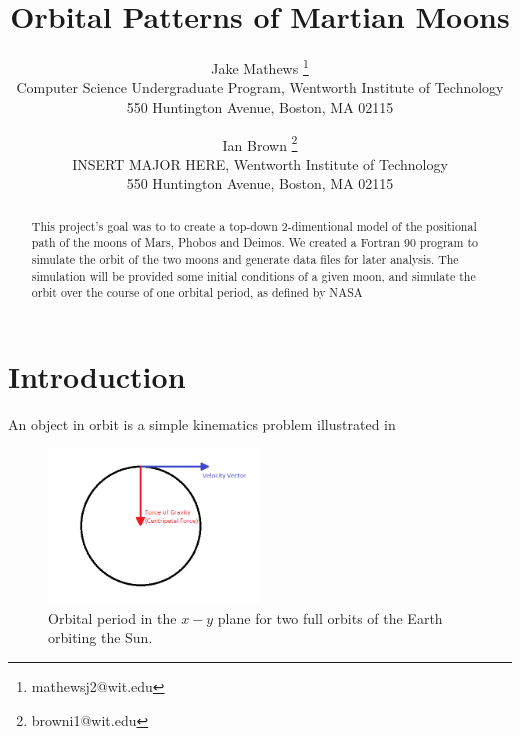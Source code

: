 \documentclass[11pt]{article}
\begin{document}
\title{\textbf{Orbital Patterns of Martian Moons}}

\author{Jake Mathews
\thanks{mathewsj2@wit.edu}\\
Computer Science Undergraduate Program, Wentworth Institute of Technology\\
550 Huntington Avenue, Boston, MA 02115\\
\and Ian Brown
\thanks{browni1@wit.edu}\\
INSERT MAJOR HERE, Wentworth Institute of Technology\\
550 Huntington Avenue, Boston, MA 02115}

\maketitle

\begin{abstract}

This project's goal was to to create a top-down 2-dimentional model
of the positional path of the moons of Mars, Phobos and Deimos.
We created a Fortran 90 program to simulate the orbit of the two moons
and generate data files for later analysis.
The simulation will be provided some initial conditions of a given moon,
and simulate the orbit over the course of one orbital period, as defined
by NASA~\cite{nasa}

\end{abstract}

\section{Introduction}
An object in orbit is a simple kinematics problem illustrated in 

\begin{figure}[ht]
  \centering
  \includegraphics[width=0.5\textwidth, angle =0]{../images/centripetal-force}
  \caption{Orbital period in the $x-y$ plane for two full orbits of the Earth orbiting the Sun.}
  \label{fig:centripital}
\end{figure}
\end{document}
